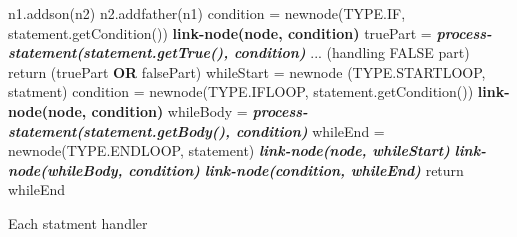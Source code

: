 \documentclass{article}
\begin{document}
\begin{algorithm}[H]
        \SetAlgoLined
        {
                n1.add\textunderscore son(n2)\;
                n2.add\textunderscore father(n1)\;
        }
        {       
                condition = new\textunderscore node(TYPE.IF, statement.getCondition())\;
                \textbf{link-node(node, condition)\;}
                truePart = \textit{\textbf{process-statement(statement.getTrue(), condition)}}\;
                ... (handling FALSE part)\;
                return (truePart \textbf{OR} falsePart)\;
        }
        {       
                whileStart = new\textunderscore node (TYPE.STARTLOOP, statment)\;
                condition = new\textunderscore node(TYPE.IFLOOP, statement.getCondition())\;
                \textbf{link-node(node, condition)\;}
                whileBody = \textit{\textbf{process-statement(statement.getBody(), condition)}}\;
                whileEnd = new\textunderscore node(TYPE.ENDLOOP, statement)\;
                \textit{\textbf{link-node(node, whileStart)\;}}
                \textit{\textbf{link-node(whileBody, condition)\;}}
                \textit{\textbf{link-node(condition, whileEnd)\;}}
                return whileEnd\;
        }
        \caption{Each statment handler}
\end{algorithm}
\end{document}
